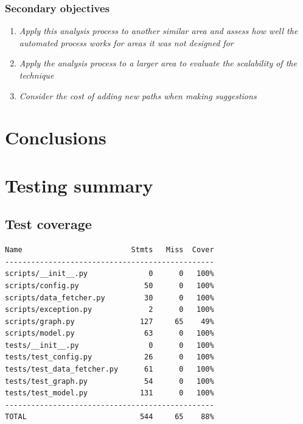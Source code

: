 \documentclass[12pt,a4paper]{report}
\begin{document}
\subsection{Secondary objectives}
\begin{enumerate}
    \item \textit{Apply this analysis process to another similar area and assess how well the automated process works for areas it was not designed for}

    \item \textit{Apply the analysis process to a larger area to evaluate the scalability of the technique}

    \item \textit{Consider the cost of adding new paths when making suggestions}
\end{enumerate}

\chapter{Conclusions}\label{chapter:concl}




\appendix
\chapter{Testing summary}\label{app:test}
\section*{Test coverage}
\begin{lstlisting}
Name                         Stmts   Miss  Cover
------------------------------------------------
scripts/__init__.py              0      0   100%
scripts/config.py               50      0   100%
scripts/data_fetcher.py         30      0   100%
scripts/exception.py             2      0   100%
scripts/graph.py               127     65    49%
scripts/model.py                63      0   100%
tests/__init__.py                0      0   100%
tests/test_config.py            26      0   100%
tests/test_data_fetcher.py      61      0   100%
tests/test_graph.py             54      0   100%
tests/test_model.py            131      0   100%
------------------------------------------------
TOTAL                          544     65    88%
\end{lstlisting}
\end{document}
